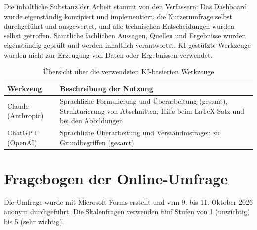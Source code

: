 \documentclass[12pt,a4paper]{scrreprt}
\begin{document}
Die inhaltliche Substanz der Arbeit stammt von den Verfassern: Das Dashboard wurde eigenständig konzipiert und implementiert, die Nutzerumfrage selbst durchgeführt und ausgewertet, und alle technischen Entscheidungen wurden selbst getroffen. Sämtliche fachlichen Aussagen, Quellen und Ergebnisse wurden eigenständig geprüft und werden inhaltlich verantwortet. KI-gestützte Werkzeuge wurden nicht zur Erzeugung von Daten oder Ergebnissen verwendet.

\begin{table}[!htb]
    \centering
    \begin{tabular}{>{\raggedright\arraybackslash}p{3.5cm}>{\raggedright\arraybackslash}p{11cm}}
        \toprule
        Werkzeug & Beschreibung der Nutzung \\
        \midrule
        Claude (Anthropic) & Sprachliche Formulierung und Überarbeitung (gesamt), Strukturierung von Abschnitten, Hilfe beim LaTeX-Satz und bei den Abbildungen \\
        ChatGPT (OpenAI) & Sprachliche Überarbeitung und Verständnisfragen zu Grundbegriffen (gesamt) \\
        \bottomrule
    \end{tabular}
    \caption{Übersicht über die verwendeten KI-basierten Werkzeuge}
    \label{tab:ki}
\end{table}

\appendix
\renewcommand{\thetable}{\thechapter.\arabic{table}}
\clearpage
\chapter{Fragebogen der Online-Umfrage}
Die Umfrage wurde mit Microsoft Forms erstellt und vom 9. bis 11. Oktober 2026 anonym durchgeführt. Die Skalenfragen verwenden fünf Stufen von 1 (unwichtig) bis 5 (sehr wichtig).
\end{document}

